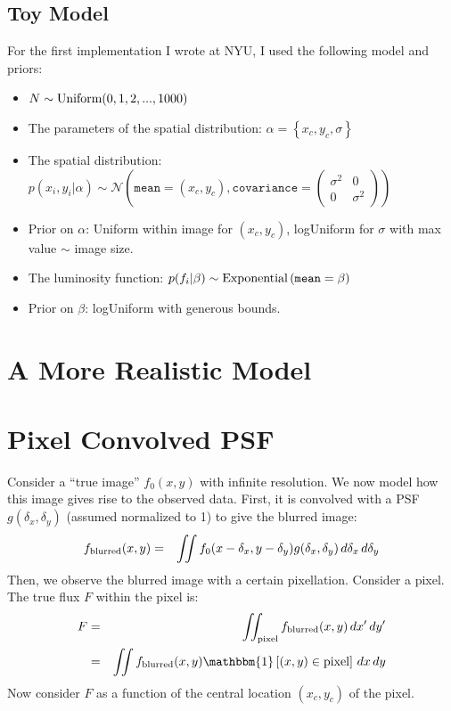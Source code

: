 \documentclass[letterpaper, 11pt]{article}
\begin{document}
\subsection{Toy Model}
For the first implementation I wrote at NYU, I used the following model and
priors:
\begin{itemize}
\item $N \sim \textnormal{Uniform}(0, 1, 2, ..., 1000)$ \\
\item The parameters of the spatial
distribution: $\alpha = \left\{x_c, y_c, \sigma\right\}$ \\
\item The spatial distribution: $p(x_i, y_i | \alpha)\sim\mathcal{N}\left(
\texttt{mean}=(x_c, y_c), \texttt{covariance}=
\left(\begin{array}{cc}\sigma^2 & 0 \\ 0 & \sigma^2\end{array}\right)\right)$ \\
\item Prior on $\alpha$: Uniform within image for $(x_c, y_c)$, logUniform for
$\sigma$ with max value $\sim$ image size.
\item The luminosity function: $p(f_i | \beta) \sim
\textnormal{Exponential}\left(\texttt{mean}=\beta\right)$ \\
\item Prior on $\beta$: logUniform with generous bounds.
\end{itemize}



\section{A More Realistic Model}
\citep{2008ApJ...682..874K}

\appendix
\section{Pixel Convolved PSF}
Consider a ``true image'' $f_0(x, y)$ with infinite resolution. We now model how
this image gives rise to the observed data. First, it is convolved with a
PSF $g(\delta_x, \delta_y)$ (assumed normalized to 1) to give the blurred image:
\begin{eqnarray}
f_{\rm{blurred}}(x, y) &=& \iint f_0(x-\delta_x, y-\delta_y)
g(\delta_x, \delta_y) \, d\delta_x \, d\delta_y \label{blur}
\end{eqnarray}
Then, we observe the blurred image with a certain pixellation. Consider a pixel.
The true flux $F$ within the pixel is:
\begin{eqnarray}
F &=& \iint_{\rm pixel} f_{\rm blurred}(x, y) \,dx'\,dy'\\
&=& \iint f_{\rm blurred}(x, y)\mathbbm{1}\left[(x,y) \in \textnormal{pixel}
\right] \,dx\,dy \label{pixel}
\end{eqnarray}
Now consider $F$ as a function of the central location $(x_c, y_c)$ of the
pixel.
\end{document}
